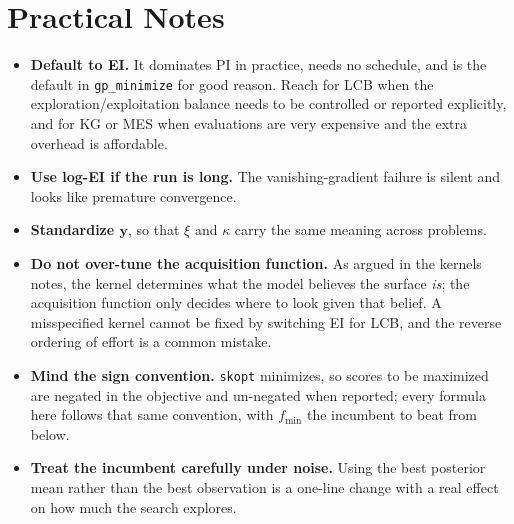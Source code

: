 \documentclass[conference]{IEEEtran}
\begin{document}
\section*{Practical Notes}
\begin{itemize}
    \item \textbf{Default to EI.} It dominates PI in practice, needs no schedule, and is the default in \texttt{gp\_minimize} for good reason. Reach for LCB when the exploration/exploitation balance needs to be controlled or reported explicitly, and for KG or MES when evaluations are very expensive and the extra overhead is affordable.
    \item \textbf{Use log-EI if the run is long.} The vanishing-gradient failure is silent and looks like premature convergence.
    \item \textbf{Standardize $\mathbf{y}$}, so that $\xi$ and $\kappa$ carry the same meaning across problems.
    \item \textbf{Do not over-tune the acquisition function.} As argued in the kernels notes, the kernel determines what the model believes the surface \textit{is}; the acquisition function only decides where to look given that belief. A misspecified kernel cannot be fixed by switching EI for LCB, and the reverse ordering of effort is a common mistake.
    \item \textbf{Mind the sign convention.} \texttt{skopt} minimizes, so scores to be maximized are negated in the objective and un-negated when reported; every formula here follows that same convention, with $f_{\min}$ the incumbent to beat from below.
    \item \textbf{Treat the incumbent carefully under noise.} Using the best posterior mean rather than the best observation is a one-line change with a real effect on how much the search explores.
\end{itemize}
\end{document}
